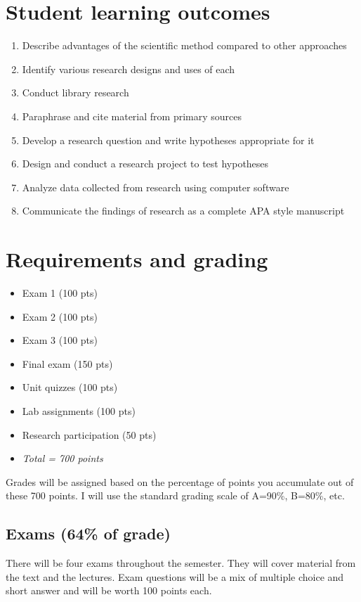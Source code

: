 \documentclass[10pt]{article}
\begin{document}
\section*{Student learning outcomes}
\label{sec:orgc11509f}

\begin{enumerate}
\item Describe advantages of the scientific method compared to other approaches
\item Identify various research designs and uses of each
\item Conduct library research
\item Paraphrase and cite material from primary sources
\item Develop a research question and write hypotheses appropriate for it
\item Design and conduct a research project to test hypotheses
\item Analyze data collected from research using computer software
\item Communicate the findings of research as a complete APA style manuscript
\end{enumerate}

\section*{Requirements and grading}
\label{sec:orgce276d5}

\begin{itemize}
\item Exam 1 (100 pts)
\item Exam 2 (100 pts)
\item Exam 3 (100 pts)
\item Final exam (150 pts)
\item Unit quizzes (100 pts)
\item Lab assignments (100 pts)
\item Research participation (50 pts)
\item \emph{Total = 700 points}
\end{itemize}

Grades will be assigned based on the percentage of points you accumulate out of these 700 points.  I will use the standard grading scale of A=90\%, B=80\%, etc.

\subsection*{Exams (64\% of grade)}
\label{sec:org91efbf3}
There will be four exams throughout the semester.  They will cover material from the text and the lectures.  Exam questions will be a mix of multiple choice and short answer and will be worth 100 points each.
\end{document}
